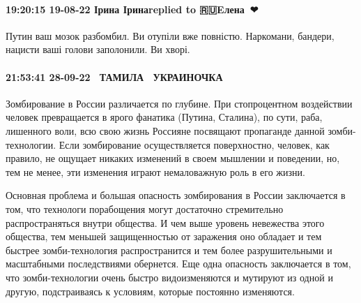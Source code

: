 \paragraph{19:20:15 19-08-22 Ірина Іринаreplied to 🇷🇺Eлена🤍💙❤}

Путин ваш мозок разбомбил. Ви отупіли вже повністю. Наркомани, бандери, нацисти
ваші голови заполонили. Ви хворі.

\paragraph{21:53:41 28-09-22 💙💛ТАМИЛА 💙💛УКРАИНОЧКА 💙💛}


Зомбирование в России различается по глубине. При стопроцентном воздействии
человек превращается в ярого фанатика (Путина, Сталина), по сути, раба,
лишенного воли, всю свою жизнь Россияне посвящают пропаганде данной
зомби-технологии. Если зомбирование осуществляется поверхностно, человек, как
правило, не ощущает никаких изменений в своем мышлении и поведении, но, тем не
менее, эти изменения играют немаловажную роль в его жизни.

Основная проблема и большая опасность зомбирования в России заключается в том,
что технологи порабощения могут достаточно стремительно распространяться внутри
общества. И чем выше уровень невежества этого общества, тем меньшей
защищенностью от заражения оно обладает и тем быстрее зомби-технология
распространится и тем более разрушительными и масштабными последствиями
обернется. Еще одна опасность заключается в том, что зомби-технологии очень
быстро видоизменяются и мутируют из одной и другую, подстраиваясь к условиям,
которые постоянно изменяются.


